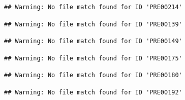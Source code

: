 \documentclass[
]{book}
\newenvironment{Shaded}{\begin{snugshade}}{\end{snugshade}}
\newcommand{\ControlFlowTok}[1]{\textcolor[rgb]{0.13,0.29,0.53}{\textbf{#1}}}
\newcommand{\DecValTok}[1]{\textcolor[rgb]{0.00,0.00,0.81}{#1}}
\newcommand{\FunctionTok}[1]{\textcolor[rgb]{0.13,0.29,0.53}{\textbf{#1}}}
\newcommand{\NormalTok}[1]{#1}
\newcommand{\OtherTok}[1]{\textcolor[rgb]{0.56,0.35,0.01}{#1}}
\newcommand{\SpecialCharTok}[1]{\textcolor[rgb]{0.81,0.36,0.00}{\textbf{#1}}}
\newcommand{\StringTok}[1]{\textcolor[rgb]{0.31,0.60,0.02}{#1}}
\theoremstyle{definition}
\theoremstyle{definition}
\theoremstyle{definition}
\theoremstyle{definition}
\theoremstyle{remark}
\begin{document}
\begin{Shaded}
\end{Shaded}

\begin{verbatim}
## Warning: No file match found for ID 'PRE00214'
\end{verbatim}

\begin{verbatim}
## Warning: No file match found for ID 'PRE00139'
\end{verbatim}

\begin{verbatim}
## Warning: No file match found for ID 'PRE00149'
\end{verbatim}

\begin{verbatim}
## Warning: No file match found for ID 'PRE00175'
\end{verbatim}

\begin{verbatim}
## Warning: No file match found for ID 'PRE00180'
\end{verbatim}

\begin{verbatim}
## Warning: No file match found for ID 'PRE00192'
\end{verbatim}
\end{document}

